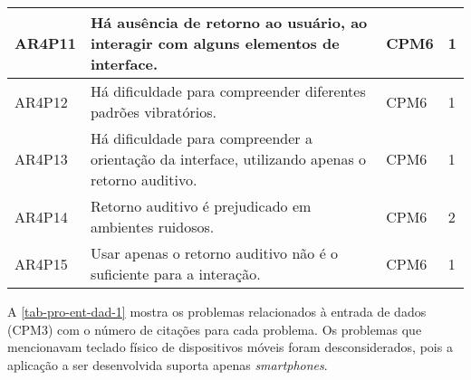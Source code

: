 \begin{table}[htb]
\begin{center}
\begin{tabular}{p{1.2cm}|p{10.0cm}|p{1.4cm}|p{1.4cm}}
      \hline
      AR4P11          & Há ausência de retorno ao usuário, ao interagir com alguns elementos de interface.               & CPM6               & 1                 \\
      \hline
      AR4P12          & Há dificuldade para compreender diferentes padrões vibratórios.                                  & CPM6               & 1                 \\
      \hline
      AR4P13          & Há dificuldade para compreender a orientação da interface, utilizando apenas o retorno auditivo. & CPM6               & 1                 \\
      \hline
      AR4P14          & Retorno auditivo é prejudicado em ambientes ruidosos.                                            & CPM6               & 2                 \\
      \hline
      AR4P15          & Usar apenas o retorno auditivo não é o suficiente para a interação.                              & CPM6               & 1                 \\
    \end{tabular}
  \end{center}
\end{table}

\newpage

A \autoref{tab-pro-ent-dad-1} mostra os problemas relacionados à entrada de dados (CPM3) com o número de citações para cada problema.
Os problemas que mencionavam teclado físico de dispositivos móveis foram desconsiderados, pois a aplicação a ser desenvolvida suporta apenas \emph{smartphones}.

